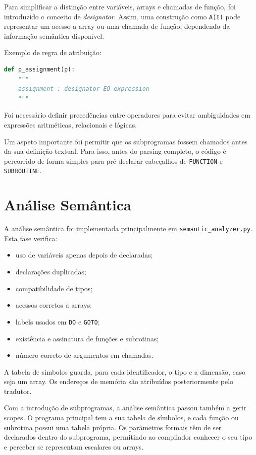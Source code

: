 \documentclass[11pt,a4paper]{article}
\begin{document}
Para simplificar a distinção entre variáveis, arrays e chamadas de função, foi introduzido o conceito de \textit{designator}. Assim, uma construção como \texttt{A(I)} pode representar um acesso a array ou uma chamada de função, dependendo da informação semântica disponível.

Exemplo de regra de atribuição:

\begin{lstlisting}[language=Python]
def p_assignment(p):
    """
    assignment : designator EQ expression
    """
\end{lstlisting}

Foi necessário definir precedências entre operadores para evitar ambiguidades em expressões aritméticas, relacionais e lógicas.

Um aspeto importante foi permitir que os subprogramas fossem chamados antes da sua definição textual. Para isso, antes do parsing completo, o código é percorrido de forma simples para pré-declarar cabeçalhos de \texttt{FUNCTION} e \texttt{SUBROUTINE}.

\section{Análise Semântica}

A análise semântica foi implementada principalmente em \texttt{semantic\_analyzer.py}. Esta fase verifica:

\begin{itemize}
    \item uso de variáveis apenas depois de declaradas;
    \item declarações duplicadas;
    \item compatibilidade de tipos;
    \item acessos corretos a arrays;
    \item labels usados em \texttt{DO} e \texttt{GOTO};
    \item existência e assinatura de funções e subrotinas;
    \item número correto de argumentos em chamadas.
\end{itemize}

A tabela de símbolos guarda, para cada identificador, o tipo e a dimensão, caso seja um array. Os endereços de memória são atribuídos posteriormente pelo tradutor.

Com a introdução de subprogramas, a análise semântica passou também a gerir scopes. O programa principal tem a sua tabela de símbolos, e cada função ou subrotina possui uma tabela própria. Os parâmetros formais têm de ser declarados dentro do subprograma, permitindo ao compilador conhecer o seu tipo e perceber se representam escalares ou arrays.
\end{document}
